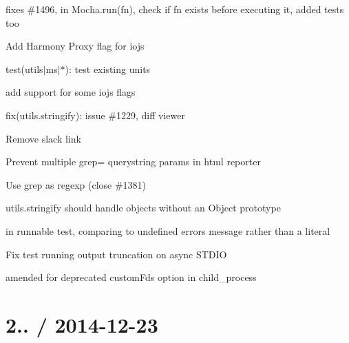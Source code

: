 \begin{DoxyItemize}
\item fixes \#1496, in Mocha.\+run(fn), check if fn exists before executing it, added tests too
\item Add Harmony Proxy flag for iojs
\item test(utils$\vert$ms$\vert$$\ast$)\+: test existing units
\item add support for some iojs flags
\item fix(utils.\+stringify)\+: issue \#1229, diff viewer
\item Remove slack link
\item Prevent multiple \textquotesingle{}grep=\textquotesingle{} querystring params in html reporter
\item Use grep as regexp (close \#1381)
\item utils.\+stringify should handle objects without an Object prototype
\item in runnable test, comparing to undefined error\textquotesingle{}s message rather than a literal
\item Fix test running output truncation on async S\+T\+D\+IO
\item amended for deprecated custom\+Fds option in child\+\_\+process
\end{DoxyItemize}

\section*{2.. / 2014-\/12-\/23}


